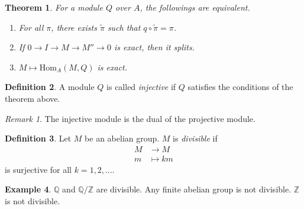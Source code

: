 \documentclass[12pt]{report}
\theoremstyle{plain}
\newtheorem{theorem}{Theorem}[section]
\theoremstyle{remark}
\newtheorem*{remark}{Remark}
\theoremstyle{definition}
\newtheorem{definition}[theorem]{Definition}
\newtheorem{example}[theorem]{Example}
\newcommand{\Z}{\mathbb{Z}}
\newcommand{\Q}{\mathbb{Q}}
\newcommand{\Hom}[3]{\mathrm{Hom}_{#3}(#1,#2)}
\begin{document}
\begin{theorem}
    For a module $Q$ over $A$, the followings are equivalent.
    \begin{enumerate}
        \item For all $\pi$, there exists $\tilde{\pi}$ such that $q\circ \tilde{\pi} = \pi$.
        \begin{figure}[H]
            \centering
        \end{figure}
        \item If $0\rightarrow I\rightarrow M\rightarrow M''\rightarrow 0$ is exact, then it splits.
        \item $M\mapsto \Hom{M}{Q}{A}$ is exact.
    \end{enumerate}
\end{theorem}


\begin{definition}
    A module $Q$ is called \emph{injective} if $Q$ satisfies the conditions of the theorem above.
\end{definition}
\begin{remark}
    The injective module is the dual of the projective module.
\end{remark}

\begin{definition}
    Let $M$ be an abelian group. $M$ is \emph{divisible} if
    \begin{align*}
        M &\rightarrow M \\
        m &\mapsto km
    \end{align*}
    is surjective for all $k=1,2,\dots$.
\end{definition}

\begin{example}
    $\Q$ and $\Q/\Z$ are divisible. Any finite abelian group is not divisible. $\Z$ is not divisible.
\end{example}
\end{document}
